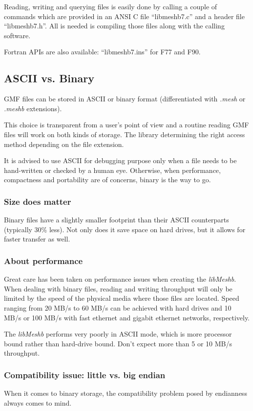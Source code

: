\documentclass[a4paper,12pt]{article}
\begin{document}
Reading, writing and querying files is easily done by calling a couple of commands which are provided in an ANSI C file ``libmeshb7.c'' and a header file ``libmeshb7.h''. All is needed is compiling those files along with the calling software.

Fortran APIs are also available: ``libmeshb7.ins'' for F77 and F90.


\subsection{ASCII vs. Binary}
GMF files can be stored in ASCII or binary format (differentiated with \emph{.mesh} or \emph{.meshb} extensions).

This choice is transparent from a user's point of view and a routine reading GMF files will work on both kinds of storage.
The library determining the right access method depending on the file extension.

It is advised to use ASCII for debugging purpose only when a file needs to be hand-written or checked by a human eye. Otherwise, when performance, compactness and portability are of concerns, binary is the way to go.


\subsubsection{Size does matter}
Binary files have a slightly smaller footprint than their ASCII counterparts (typically 30\% less). Not only does it save space on hard drives, but it allows for faster transfer as well.


\subsubsection{About performance}
Great care has been taken on performance issues when creating the \emph{libMeshb}. When dealing with binary files, reading and writing throughput will only be limited by the speed of the physical media where those files are located. Speed ranging from 20 MB/s to 60 MB/s can be achieved with hard drives and 10 MB/s or 100 MB/s with fast ethernet and gigabit ethernet networks, respectively.

The \emph{libMeshb} performs very poorly in ASCII mode, which is more processor bound rather than hard-drive bound. Don't expect more than 5 or 10 MB/s throughput.

\subsubsection{Compatibility issue: little vs. big endian}
When it comes to binary storage, the compatibility problem posed by endianness always comes to mind.
\end{document}
